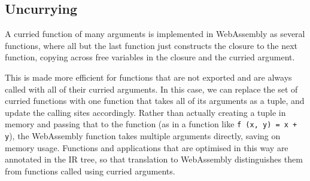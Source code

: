 \subsection{Uncurrying}


A curried function of many arguments is implemented in WebAssembly as several functions, where all but the last function just constructs the closure to the next function, copying across free variables in the closure and the curried argument. 

This is made more efficient for functions that are not exported and are always called with all of their curried arguments.  In this case, we can replace the set of curried functions with one function that takes all of its arguments as a tuple, and update the calling sites accordingly. Rather than actually creating a tuple in memory and passing that to the function (as in a function like \verb|f (x, y) = x + y|), the WebAssembly function takes multiple arguments directly, saving on memory usage. Functions and applications that are optimised in this way are annotated in the IR tree, so that translation to WebAssembly distinguishes them from functions called using curried arguments.

